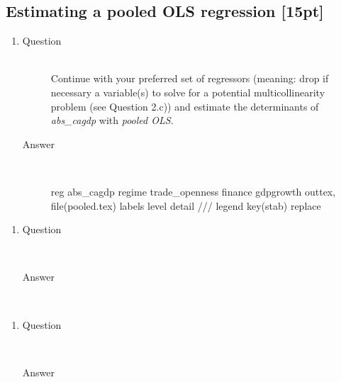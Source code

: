 \documentclass{article}
\begin{document}
\subsection{Estimating a pooled OLS regression [15pt]}
  
  \begin{enumerate}[label=(\alph*)]
    \item 
    \begin{description}
      \item[Question] \hfill \\
      Continue with your preferred set of regressors (meaning: drop if necessary a variable(s) to solve for a potential multicollinearity problem (see Question 2.c)) and estimate the determinants of \textit{abs\_cagdp} with \textit{pooled OLS}.
      \item[Answer] \hfill \\
      \begin{CVerbatim}
reg abs_cagdp regime trade_openness finance gdpgrowth
outtex, file(pooled.tex) labels level detail ///
  legend key(stab) replace
      \end{CVerbatim}
      
    \end{description}
  \end{enumerate}
  
  \begin{enumerate}[label=(\alph*)]
    \item 
    \begin{description}
      \item[Question] \hfill \\

      \item[Answer] \hfill \\
      
    \end{description}
  \end{enumerate}
  
  \begin{enumerate}[label=(\alph*)]
    \item 
    \begin{description}
      \item[Question] \hfill \\

      \item[Answer] \hfill \\
      
    \end{description}
  \end{enumerate}
  
\end{document}
